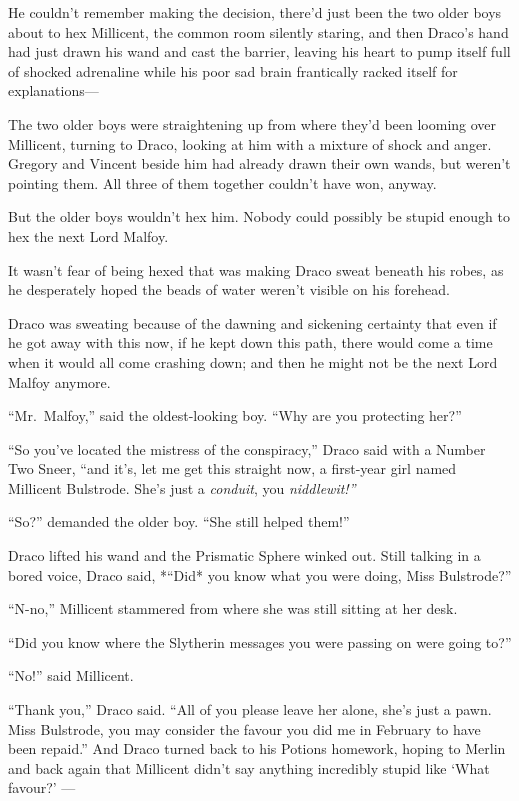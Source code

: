 He couldn't remember making the decision, there'd just been the two
older boys about to hex Millicent, the common room silently staring, and
then Draco's hand had just drawn his wand and cast the barrier, leaving
his heart to pump itself full of shocked adrenaline while his poor sad
brain frantically racked itself for explanations---

The two older boys were straightening up from where they'd been looming
over Millicent, turning to Draco, looking at him with a mixture of shock
and anger. Gregory and Vincent beside him had already drawn their own
wands, but weren't pointing them. All three of them together couldn't
have won, anyway.

But the older boys wouldn't hex him. Nobody could possibly be stupid
enough to hex the next Lord Malfoy.

It wasn't fear of being hexed that was making Draco sweat beneath his
robes, as he desperately hoped the beads of water weren't visible on his
forehead.

Draco was sweating because of the dawning and sickening certainty that
even if he got away with this now, if he kept down this path, there
would come a time when it would all come crashing down; and then he
might not be the next Lord Malfoy anymore.

``Mr.~Malfoy,'' said the oldest-looking boy. ``Why are you protecting
her?''

``So you've located the mistress of the conspiracy,'' Draco said with a
Number Two Sneer, ``and it's, let me get this straight now, a first-year
girl named Millicent Bulstrode. She's just a \emph{conduit}, you
\emph{niddlewit!''}

``So?'' demanded the older boy. ``She still helped them!''

Draco lifted his wand and the Prismatic Sphere winked out. Still talking
in a bored voice, Draco said, *``Did* you know what you were doing, Miss
Bulstrode?''

``N-no,'' Millicent stammered from where she was still sitting at her
desk.

``Did you know where the Slytherin messages you were passing on were
going to?''

``No!'' said Millicent.

``Thank you,'' Draco said. ``All of you please leave her alone, she's
just a pawn. Miss Bulstrode, you may consider the favour you did me in
February to have been repaid.'' And Draco turned back to his Potions
homework, hoping to Merlin and back again that Millicent didn't say
anything incredibly stupid like `What favour?' ---

